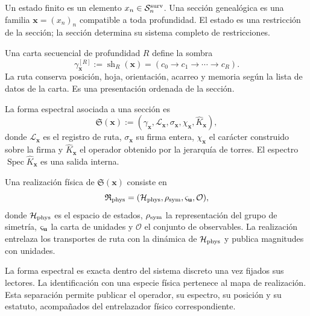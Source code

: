 \begin{definition}
\label{def:estado-finito-seccion-genealogica-md}
Un estado finito es un elemento
\(x_n\in\mathcal S_n^{\rm surv}\). Una sección genealógica es una familia
\(\boldsymbol x=(x_n)_n\) compatible a toda profundidad. El estado es una
restricción de la sección; la sección determina su sistema completo de
restricciones.
\end{definition}

\begin{definition}
\label{def:ruta-observable-bisagra-md}
Una carta secuencial de profundidad \(R\) define la sombra
\[
 \gamma_{\boldsymbol x}^{[R]}
 :=\operatorname{sh}_R(\boldsymbol x)
 =(c_0\to c_1\to\cdots\to c_R).
\]
La ruta conserva posición, hoja, orientación, acarreo y memoria según la
lista de datos de la carta. Es una presentación ordenada de la sección.
\end{definition}

\begin{definition}
\label{def:forma-espectral-numero-md}
La forma espectral asociada a una sección es
\[
 \mathfrak S(\boldsymbol x)
 :=(\gamma_{\boldsymbol x},
    \mathcal L_{\boldsymbol x},
    \sigma_{\boldsymbol x},
    \chi_{\boldsymbol x},
    \widehat K_{\boldsymbol x}),
\]
donde \(\mathcal L_{\boldsymbol x}\) es el registro de ruta,
\(\sigma_{\boldsymbol x}\) su firma entera, \(\chi_{\boldsymbol x}\) el
carácter construido sobre la firma y \(\widehat K_{\boldsymbol x}\) el
operador obtenido por la jerarquía de torres. El espectro
\(\operatorname{Spec}\widehat K_{\boldsymbol x}\) es una salida interna.
\end{definition}

\begin{definition}
\label{def:realizacion-fisica-forma-espectral}
Una realización física de \(\mathfrak S(\boldsymbol x)\) consiste en
\[
 \mathfrak R_{\rm phys}
 =(\mathcal H_{\rm phys},\rho_{\rm sym},\varsigma_{\bf u},\mathcal O),
\]
donde \(\mathcal H_{\rm phys}\) es el espacio de estados,
\(\rho_{\rm sym}\) la representación del grupo de simetría,
\(\varsigma_{\bf u}\) la carta de unidades y \(\mathcal O\) el conjunto de
observables. La realización entrelaza los transportes de ruta con la dinámica
de \(\mathcal H_{\rm phys}\) y publica magnitudes con unidades.
\end{definition}

La forma espectral es exacta dentro del sistema discreto una vez fijados sus
lectores. La identificación con una especie física pertenece al mapa de
realización. Esta separación permite publicar el operador, su espectro, su
posición y su estatuto, acompañados del entrelazador físico correspondiente.

